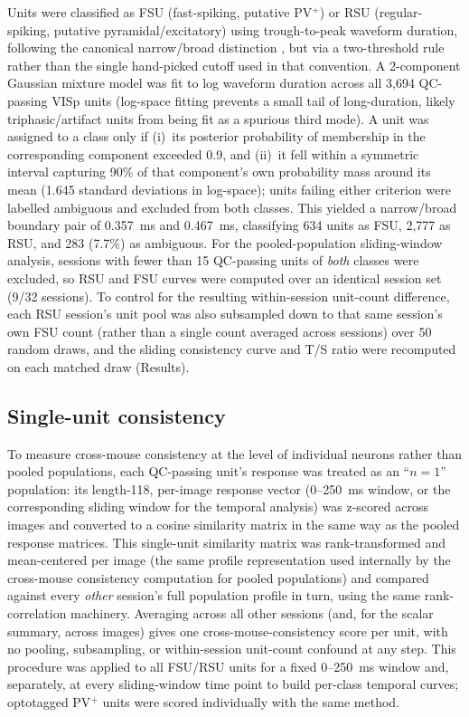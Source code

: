 \documentclass[11pt,onecolumn]{article}
\begin{document}
Units were classified as FSU (fast-spiking, putative PV$^+$) or RSU
(regular-spiking, putative pyramidal/excitatory) using trough-to-peak
waveform duration, following the canonical narrow/broad distinction
\citep{bartho2004,mccormick1985}, but via a two-threshold rule rather
than the single hand-picked cutoff used in that convention.  A
2-component Gaussian mixture model was fit to log waveform duration
across all 3,694 QC-passing VISp units (log-space fitting prevents a
small tail of long-duration, likely triphasic/artifact units from being
fit as a spurious third mode).  A unit was assigned to a class only if
(i)~its posterior probability of membership in the corresponding
component exceeded 0.9, and (ii)~it fell within a symmetric interval
capturing 90\% of that component's own probability mass around its mean
(1.645 standard deviations in log-space); units failing either criterion
were labelled ambiguous and excluded from both classes.  This yielded a
narrow/broad boundary pair of 0.357~ms and 0.467~ms, classifying 634
units as FSU, 2,777 as RSU, and 283 (7.7\%) as ambiguous.  For the
pooled-population sliding-window analysis, sessions with fewer than 15
QC-passing units of \textit{both} classes were excluded, so RSU and FSU
curves were computed over an identical session set (9/32 sessions).  To
control for the resulting within-session unit-count difference, each RSU
session's unit pool was also subsampled down to that same session's own
FSU count (rather than a single count averaged across sessions) over 50
random draws, and the sliding consistency curve and T/S ratio were
recomputed on each matched draw (Results).

\subsection{Single-unit consistency}

To measure cross-mouse consistency at the level of individual neurons
rather than pooled populations, each QC-passing unit's response was
treated as an ``$n=1$'' population: its length-118, per-image response
vector (0--250~ms window, or the corresponding sliding window for the
temporal analysis) was z-scored across images and converted to a cosine
similarity matrix in the same way as the pooled response matrices.  This
single-unit similarity matrix was rank-transformed and mean-centered
per image (the same profile representation used internally by the
cross-mouse consistency computation for pooled populations) and compared
against every \textit{other} session's full population profile in turn,
using the same rank-correlation machinery.  Averaging across all other
sessions (and, for the scalar summary, across images) gives one
cross-mouse-consistency score per unit, with no pooling, subsampling, or
within-session unit-count confound at any step.  This procedure was
applied to all FSU/RSU units for a fixed 0--250~ms window and, separately,
at every sliding-window time point to build per-class temporal curves;
optotagged PV$^+$ units were scored individually with the same method.
\end{document}
